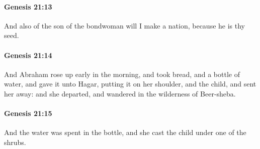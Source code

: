 		\paragraph{Genesis 21:13} %
			\label{GENESIS-21-13}

			And also of the son of the bondwoman will I make a nation, because he is thy seed.


		\paragraph{Genesis 21:14} %
			\label{GENESIS-21-14}

			And Abraham rose up early in the morning, and took bread, and a bottle of water, and gave it unto Hagar, putting it on her shoulder, and the child, and sent her away: and she departed, and wandered in the wilderness of Beer-sheba.


		\paragraph{Genesis 21:15} %
			\label{GENESIS-21-15}

			And the water was spent in the bottle, and she cast the child under one of the shrubs.


